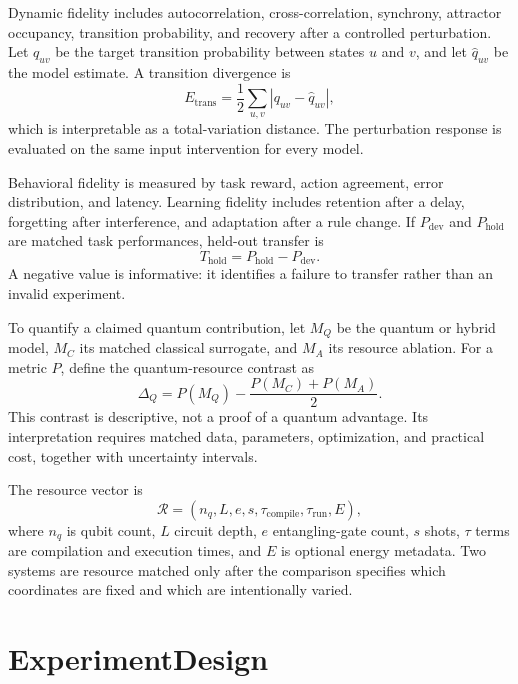 \documentclass[conference]{IEEEtran}
\begin{document}
Dynamic fidelity includes autocorrelation, cross-correlation, synchrony, attractor
occupancy, transition probability, and recovery after a controlled perturbation. Let
$q_{uv}$ be the target transition probability between states $u$ and $v$, and let
$\hat{q}_{uv}$ be the model estimate. A transition divergence is
\begin{equation}
E_{\mathrm{trans}}=\frac{1}{2}\sum_{u,v}\left|q_{uv}-\hat{q}_{uv}\right|,
\label{eq:transition}
\end{equation}
which is interpretable as a total-variation distance. The perturbation response is
evaluated on the same input intervention for every model.

Behavioral fidelity is measured by task reward, action agreement, error distribution,
and latency. Learning fidelity includes retention after a delay, forgetting after
interference, and adaptation after a rule change. If $P_{\mathrm{dev}}$ and
$P_{\mathrm{hold}}$ are matched task performances, held-out transfer is
\begin{equation}
T_{\mathrm{hold}}=P_{\mathrm{hold}}-P_{\mathrm{dev}}.
\label{eq:transfer}
\end{equation}
A negative value is informative: it identifies a failure to transfer rather than an
invalid experiment.

To quantify a claimed quantum contribution, let $M_Q$ be the quantum or hybrid model,
$M_C$ its matched classical surrogate, and $M_A$ its resource ablation. For a metric
$P$, define the quantum-resource contrast as
\begin{equation}
\Delta_Q=P(M_Q)-\frac{P(M_C)+P(M_A)}{2}.
\label{eq:quantumcontrast}
\end{equation}
This contrast is descriptive, not a proof of a quantum advantage. Its interpretation
requires matched data, parameters, optimization, and practical cost, together with
uncertainty intervals.

The resource vector is
\begin{equation}
\mathcal{R}=(n_q,L,e,s,\tau_{\mathrm{compile}},\tau_{\mathrm{run}},E),
\label{eq:resources}
\end{equation}
where $n_q$ is qubit count, $L$ circuit depth, $e$ entangling-gate count, $s$ shots,
$\tau$ terms are compilation and execution times, and $E$ is optional energy metadata.
Two systems are resource matched only after the comparison specifies which coordinates
are fixed and which are intentionally varied.

\section{ExperimentDesign}
\label{sec:design}
\end{document}
